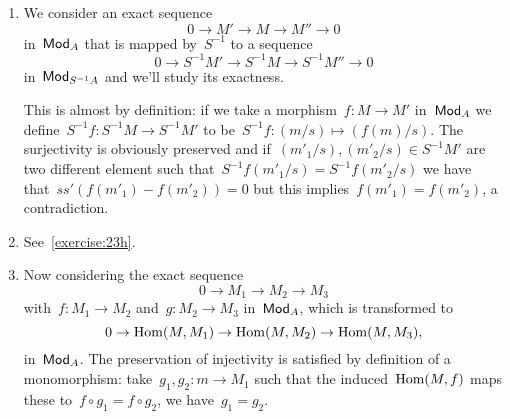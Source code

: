 \begin{exercise}
  \begin{enumerate}
    \item We consider an exact sequence
      \begin{equation}
        0\to M'\to M\to M''\to 0 
      \end{equation}
      in~$\mathsf{Mod}_A$ that is mapped by~$S^{-1}$ to a sequence
      \begin{equation}
        0\to S^{-1}M'\to S^{-1}M\to S^{-1}M''\to 0
      \end{equation}
      in~$\mathsf{Mod}_{S^{-1}A}$ and we'll study its exactness.

      This is almost by definition: if we take a morphism~$f\colon M\to M'$ in~$\mathsf{Mod}_A$ we define~$S^{-1}f\colon S^{-1}M\to S^{-1}M'$ to be~$S^{-1}f\colon (m/s)\mapsto (f(m)/s)$. The surjectivity is obviously preserved and if~$(m'_1/s),(m'_2/s)\in S^{-1}M'$ are two different element such that~$S^{-1}f(m'_1/s)=S^{-1}f(m'_2/s)$ we have that~$ss'(f(m'_1)-f(m'_2))=0$ but this implies~$f(m'_1)=f(m'_2)$, a contradiction.

    \item See~\autoref{exercise:23h}.

    \item Now considering the exact sequence
      \begin{equation}
        0\to M_1\to M_2\to M_3
      \end{equation}
      with~$f\colon M_1\to M_2$ and~$g\colon M_2\to M_3$ in~$\mathsf{Mod}_A$, which is transformed to
      \begin{equation}
        0\to\operatorname{Hom}(M,M_1)\to\operatorname{Hom}(M,M_2)\to\operatorname{Hom}(M,M_3),
      \end{equation}
      in~$\mathsf{Mod}_A$. The preservation of injectivity is satisfied by definition of a monomorphism: take~$g_1,g_2\colon m\to M_1$ such that the induced~$\operatorname{Hom}(M,f)$ maps these to~$f\circ g_1=f\circ g_2$, we have~$g_1=g_2$.


\end{enumerate}
\end{exercise}
